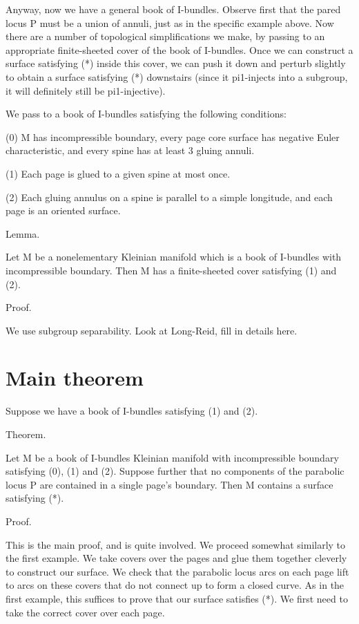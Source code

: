 \documentclass[12pt]{amsart}
\theoremstyle{definition}
\theoremstyle{remark}
\begin{document}
Anyway, now we have a general book of I-bundles. Observe first that the pared
locus P must be a union of annuli, just as in the specific example above.  Now
there are a number of topological simplifications we make, by passing to an
appropriate finite-sheeted cover of the book of I-bundles.  Once we can
construct a surface satisfying (*) inside this cover, we can push it down and
perturb slightly to obtain a surface satisfying (*) downstairs (since it
pi1-injects into a subgroup, it will definitely still be pi1-injective).

We pass to a book of I-bundles satisfying the following conditions:

(0) M has incompressible boundary, every page core surface has negative Euler
characteristic, and every spine has at least 3 gluing annuli.

(1) Each page is glued to a given spine at most once.

(2) Each gluing annulus on a spine is parallel to a simple longitude, and each
page is an oriented surface.

Lemma.

Let M be a nonelementary Kleinian manifold which is a book of I-bundles with
incompressible boundary. Then M has a finite-sheeted cover satisfying (1) and
(2).

Proof.

We use subgroup separability. Look at Long-Reid, fill in details here.

\section{Main theorem}

Suppose we have a book of I-bundles satisfying (1) and (2).

Theorem.

Let M be a book of I-bundles Kleinian manifold with incompressible boundary
satisfying (0), (1) and (2). Suppose further that no components of the
parabolic locus P are contained in a single page's boundary. Then M contains
a surface satisfying (*).

Proof.

This is the main proof, and is quite involved. We proceed somewhat similarly to
the first example. We take covers over the pages and glue them together
cleverly to construct our surface. We check that the parabolic locus arcs on
each page lift to arcs on these covers that do not connect up to form a closed
curve. As in the first example, this suffices to prove that our surface
satisfies (*). We first need to take the correct cover over each page.
\end{document}
